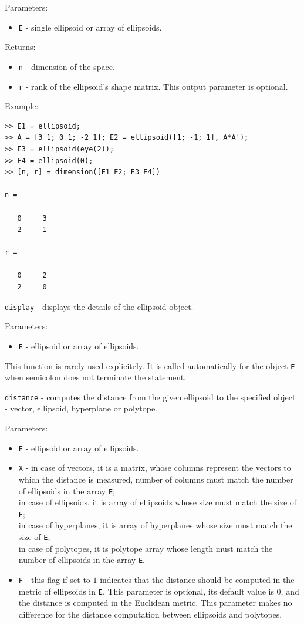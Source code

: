 \documentclass{report}
\begin{document}
Parameters:
\begin{itemize}
\item {\tt E} - single ellipsoid or array of ellipsoids.
\end{itemize}

Returns:
\begin{itemize}
\item {\tt n} - dimension of the space.
\item {\tt r} - rank of the ellipsoid's shape matrix. This output parameter
is optional.
\end{itemize}

Example:
{\tt \begin{verbatim}
>> E1 = ellipsoid;
>> A = [3 1; 0 1; -2 1]; E2 = ellipsoid([1; -1; 1], A*A');
>> E3 = ellipsoid(eye(2));
>> E4 = ellipsoid(0);
>> [n, r] = dimension([E1 E2; E3 E4])

n =

   0     3
   2     1

r =

   0     2
   2     0
\end{verbatim} }

\newpage

{\Large {\tt display}} - displays the details of the ellipsoid object.

Parameters:
\begin{itemize}
\item {\tt E} - ellipsoid or array of ellipsoids.
\end{itemize}
This function is rarely used explicitely. It is called automatically
for the object {\tt E} when semicolon does not terminate the statement.

\newpage

{\Large {\tt distance}} - computes the distance from the given ellipsoid
to the specified object - vector, ellipsoid, hyperplane or polytope.

Parameters:
\begin{itemize}
\item {\tt E} - ellipsoid or array of ellipsoids.
\item {\tt X} - in case of vectors, it is a matrix, whose columns represent
the vectors to which the distance is measured, number of columns must match
the number of ellipsoids in the array {\tt E};\\
in case of ellipsoids, it is array of ellipsoids whose size must match the
size of {\tt E};\\
in case of hyperplanes, it is array of hyperplanes whose size must match the
size of {\tt E};\\
in case of polytopes, it is polytope array whose length must match
the number of ellipsoids in the array {\tt E}.
\item {\tt F} - this flag if set to $1$ indicates that the distance should
be computed in the metric of ellipsoids in {\tt E}. This parameter is optional,
its default value is $0$, and the distance is computed in the Euclidean metric.
This parameter makes no difference for the distance computation
between ellipsoids and polytopes.
\end{itemize}
\end{document}
